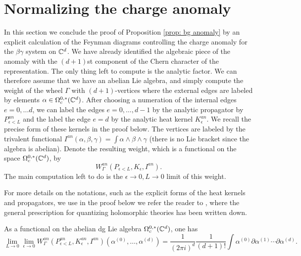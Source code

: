 \section{Normalizing the charge anomaly} \label{sec: feynman}

In this section we conclude the proof of Proposition \ref{prop: bg anomaly} by an explicit calculation of the Feynman diagrams controlling the charge anomaly for the $\beta\gamma$ system on $\mathbb C^d$. 
We have already identified the algebraic piece of the anomaly with the $(d+1)$st component of the Chern character of the representation. 
The only thing left to compute is the analytic factor. 
We can therefore assume that we have an abelian Lie algebra, and simply compute the weight of the wheel $\Gamma$ with $(d+1)$-vertices where the external edges are labeled by elements $\alpha \in \Omega_c^{0,*}(\mathbb C^d)$.
After choosing a numeration of the internal edges $e = 0,\ldots d$, we can label the edges $e = 0,\ldots, d-1$ by the analytic propagator by $P^{an}_{\epsilon<L}$ and the label the edge $e = d$ by the analytic heat kernel $K_\epsilon^{an}$. 
We recall the precise form of these kernels in the proof below. 
The vertices are labeled by the trivalent functional $I^{an} (\alpha, \beta,\gamma) = \int \alpha \wedge \beta \wedge \gamma$ (there is no Lie bracket since the algebra is abelian). 
Denote the resulting weight, which is a functional on the space $\Omega^{0,*}_c(\mathbb C^d)$, by
\[
W^{an}_{\Gamma}(P_{\epsilon < L}, K_\epsilon, I^{an}) .
\]
The main computation left to do is the $\epsilon \to 0, L \to 0$ limit of this weight.

For more details on the notations, such as the explicit forms of the heat kernels and propagators, we use in the proof below we refer the reader to \cite{BWhol}, where the general prescription for quantizing holomorphic theories has been written down. 

\begin{lem} 
As a functional on the abelian dg Lie algebra $\Omega_c^{0,*}(\mathbb C^d)$, one has
\[
\lim_{L \to 0} \lim_{\epsilon \to 0} W^{an}_{\Gamma}(P^{an}_{\epsilon < L}, K^{an}_\epsilon, I^{an})(\alpha^{(0)},\ldots, \alpha^{(d)}) = \frac{1}{(2 \pi i)^d} \frac{1}{(d+1)!} \int \alpha^{(0)} \partial \alpha^{(1)} \cdots \partial \alpha^{(d)}  .
\]
\end{lem}

